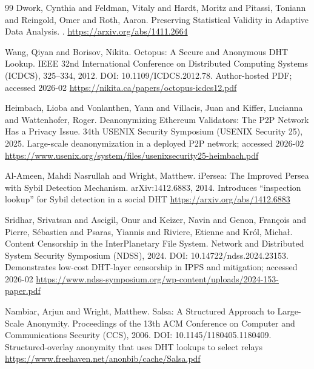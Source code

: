 \documentclass[11pt]{article}
\begin{document}
\begin{thebibliography}{99}
Dwork, Cynthia and Feldman, Vitaly and Hardt, Moritz and Pitassi, Toniann and Reingold, Omer and Roth, Aaron.
\newblock Preserving Statistical Validity in Adaptive Data Analysis.
.
\newblock \url{https://arxiv.org/abs/1411.2664}

Wang, Qiyan and Borisov, Nikita.
\newblock Octopus: A Secure and Anonymous DHT Lookup.
 IEEE 32nd International Conference on Distributed Computing Systems (ICDCS), 325--334, 2012.
\newblock DOI: 10.1109/ICDCS.2012.78.
\newblock Author-hosted PDF; accessed 2026-02
\newblock \url{https://nikita.ca/papers/octopus-icdcs12.pdf}

Heimbach, Lioba and Vonlanthen, Yann and Villacis, Juan and Kiffer, Lucianna and Wattenhofer, Roger.
\newblock Deanonymizing Ethereum Validators: The P2P Network Has a Privacy Issue.
\newblock 34th USENIX Security Symposium (USENIX Security 25), 2025.
\newblock Large-scale deanonymization in a deployed P2P network; accessed 2026-02
\newblock \url{https://www.usenix.org/system/files/usenixsecurity25-heimbach.pdf}

Al-Ameen, Mahdi Nasrullah and Wright, Matthew.
\newblock iPersea: The Improved Persea with Sybil Detection Mechanism.
\newblock arXiv:1412.6883, 2014.
\newblock Introduces ``inspection lookup'' for Sybil detection in a social DHT
\newblock \url{https://arxiv.org/abs/1412.6883}

Sridhar, Srivatsan and Ascigil, Onur and Keizer, Navin and Genon, Fran{\c{c}}ois and Pierre, S{\'e}bastien and Psaras, Yiannis and Riviere, Etienne and Kr{\'o}l, Micha{\l}.
\newblock Content Censorship in the InterPlanetary File System.
\newblock Network and Distributed System Security Symposium (NDSS), 2024.
\newblock DOI: 10.14722/ndss.2024.23153.
\newblock Demonstrates low-cost DHT-layer censorship in IPFS and mitigation; accessed 2026-02
\newblock \url{https://www.ndss-symposium.org/wp-content/uploads/2024-153-paper.pdf}

Nambiar, Arjun and Wright, Matthew.
\newblock Salsa: A Structured Approach to Large-Scale Anonymity.
\newblock Proceedings of the 13th ACM Conference on Computer and Communications Security (CCS), 2006.
\newblock DOI: 10.1145/1180405.1180409.
\newblock Structured-overlay anonymity that uses DHT lookups to select relays
\newblock \url{https://www.freehaven.net/anonbib/cache/Salsa.pdf}


\end{thebibliography}
\end{document}
